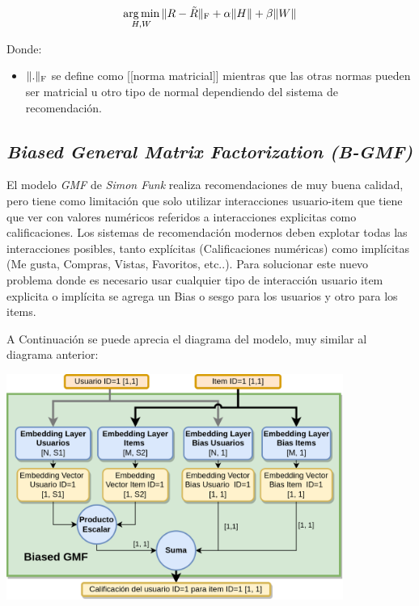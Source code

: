 \documentclass[11pt,a4paper,twoside]{thesis}
\begin{document}
\begin{equation*}
\underset{H, W}{\operatorname{arg\,min}}\, \|R - \tilde{R}\|_{\rm F} + \alpha\|H\| + \beta\|W\|
\end{equation*}
\begin{description}
\item[Donde:]
\end{description}
\begin{itemize}
\item $\|.\|_{\rm F}$ se define como [[norma matricial]] mientras que las otras normas pueden ser matricial u otro tipo de normal dependiendo del sistema de recomendación.
\end{itemize}

\subsection{\textit{Biased General Matrix Factorization (B-GMF)}}

El modelo \textit{GMF} de \textit{Simon Funk} realiza recomendaciones de muy buena calidad, pero tiene como limitación que solo utilizar interacciones usuario-item que tiene que ver con valores numéricos referidos a interacciones explicitas como calificaciones. Los sistemas de recomendación modernos deben explotar todas las interacciones posibles, tanto explícitas (Calificaciones numéricas) como implícitas (Me gusta, Compras, Vistas, Favoritos, etc..). Para solucionar este nuevo problema donde es necesario usar cualquier tipo de interacción usuario item explicita o implícita se agrega un Bias o sesgo para los usuarios y otro para los items.

A Continuación se puede aprecia el diagrama del modelo, muy similar al diagrama anterior:

\begin{center}
	\includegraphics[width=11cm]{./images/Biased-GMF.png}
\end{center}
\end{document}
